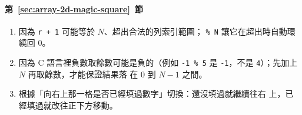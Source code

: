 \paragraph{第~\ref{sec:array-2d-magic-square}~節}
\begin{enumerate}
\item 因為 \texttt{r + 1} 可能等於 $N$、超出合法的列索引範圍；
\texttt{\% N} 讓它在超出時自動環繞回 $0$。
\item 因為 C 語言裡負數取餘數可能是負的（例如 \texttt{-1 \% 5} 是
\texttt{-1}，不是 \texttt{4}）；先加上 $N$ 再取餘數，才能保證結果落
在 $0$ 到 $N-1$ 之間。
\item 根據「向右上那一格是否已經填過數字」切換：還沒填過就繼續往右
上，已經填過就改往正下方移動。
\end{enumerate}
